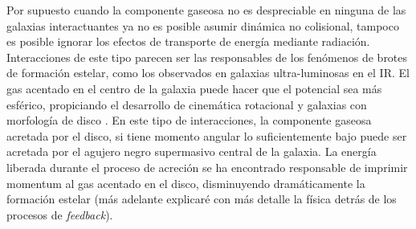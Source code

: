 \documentclass{article}
\begin{document}
\begin{description}
Por supuesto cuando la componente gaseosa no es despreciable en ninguna de las galaxias
interactuantes ya no es posible asumir dinámica no colisional, tampoco es posible ignorar los
efectos de transporte de energía mediante radiación. Interacciones de este tipo parecen ser las
responsables de los fenómenos de brotes de formación estelar, como los observados en galaxias
ultra-luminosas en el IR. El gas acentado en el centro de la galaxia puede hacer que el potencial
sea más esférico, propiciando el desarrollo de cinemática rotacional y galaxias con morfología de
disco \citep{Jesseit2007}. En este tipo de interacciones, la componente gaseosa acretada por el
disco, si tiene momento angular lo suficientemente bajo puede ser acretada por el agujero negro
supermasivo central de la galaxia. La energía liberada durante el proceso de acreción se ha
encontrado responsable de imprimir momentum al gas acentado en el disco, disminuyendo dramáticamente
la formación estelar (más adelante explicaré con más detalle la física detrás de los procesos de
\emph{feedback}).
\end{description}
\end{document}

